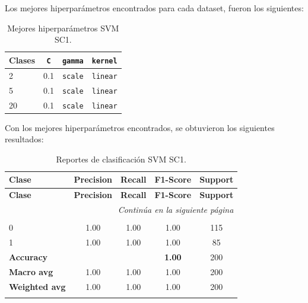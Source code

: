 \documentclass[12pt,a4paper]{article}
\begin{document}
\begin{enumerate}
  Los mejores hiperparámetros encontrados para cada dataset, fueron los siguientes:

  \begin{table}[H]
    \centering
    \begin{tabular}{@{}lccc@{}}
      \toprule
      \textbf{Clases} & \texttt{C} & \texttt{gamma} & \texttt{kernel} \\
      \midrule
      2  & 0.1 & \texttt{scale} & \texttt{linear} \\
      5  & 0.1 & \texttt{scale} & \texttt{linear} \\
      20 & 0.1 & \texttt{scale} & \texttt{linear} \\
      \bottomrule
    \end{tabular}
    \caption{Mejores hiperparámetros SVM SC1.}
    \label{tab:best_hparams_svm_sc1}
  \end{table}
  
  Con los mejores hiperparámetros encontrados, se obtuvieron los siguientes resultados:

  \small
  \setlength{\tabcolsep}{4pt}
  \begin{longtable}{@{}lcccc@{}}
    \toprule
    \textbf{Clase} & \textbf{Precision} & \textbf{Recall} & \textbf{F1-Score} & \textbf{Support} \\
    \midrule
    \endfirsthead

    \toprule
    \textbf{Clase} & \textbf{Precision} & \textbf{Recall} & \textbf{F1-Score} & \textbf{Support} \\
    \midrule
    \endhead

    \midrule
    \multicolumn{5}{r}{\emph{Continúa en la siguiente página}} \\
    \endfoot

    \bottomrule
    \caption{Reportes de clasificación SVM SC1.}
    \label{tab:reportes_clasificacion_svm}
    \endlastfoot

    \multicolumn{5}{@{}l}{\textbf{(a) 2 clases}}\\
    0 & 1.00 & 1.00 & 1.00 & 115 \\
    1 & 1.00 & 1.00 & 1.00 & 85 \\
    \midrule
    \multicolumn{3}{l}{\textbf{Accuracy}} & \textbf{1.00} & 200 \\
    \textbf{Macro avg}    & 1.00 & 1.00 & 1.00 & 200 \\
    \textbf{Weighted avg} & 1.00 & 1.00 & 1.00 & 200 \\
    \addlinespace[0.8em]


\end{longtable}
\end{enumerate}
\end{document}
